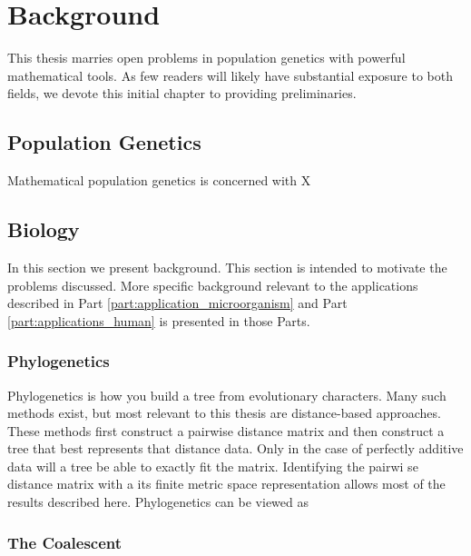 
\chapter{Background}
\label{ch:background}

This thesis marries open problems in population genetics with powerful mathematical tools.
As few readers will likely have substantial exposure to both fields, we devote this initial chapter to providing preliminaries.

\section{Population Genetics}

Mathematical population genetics is concerned with X

\section{Biology}

In this section we present background.
This section is intended to motivate the problems discussed.
More specific background relevant to the applications described in Part \ref{part:application_microorganism} and Part \ref{part:applications_human} is presented in those Parts.

\subsection{Phylogenetics}

Phylogenetics is how you build a tree from evolutionary characters.
Many such methods exist, but most relevant to this thesis are distance-based approaches.
These methods first construct a pairwise distance matrix and then construct a tree that best represents that distance data.
Only in the case of perfectly additive data will a tree be able to exactly fit the matrix.
Identifying the pairwi se distance matrix with a its finite metric space representation allows most of the results described here.
Phylogenetics can be viewed as 

\subsection{The Coalescent}

